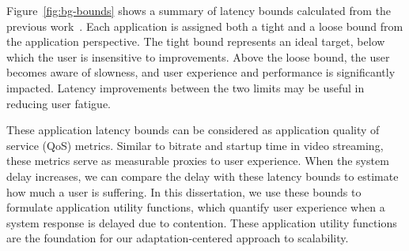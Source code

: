 Figure~\ref{fig:bg-bounds} shows a summary of latency bounds calculated from the
previous work~\cite{chen2017empirical}. Each application is assigned both a
tight and a loose bound from the application perspective. The tight bound
represents an ideal target, below which the user is insensitive to improvements.
Above the loose bound, the user becomes aware of slowness, and user experience
and performance is significantly impacted. Latency improvements between the two
limits may be useful in reducing user fatigue.

These application latency bounds can be considered as application quality of
service (QoS) metrics. Similar to bitrate and startup time in video streaming,
these metrics serve as measurable proxies to user experience. When the system
delay increases, we can compare the delay with these latency bounds to estimate
how much a user is suffering. In this dissertation, we use these bounds to
formulate application utility functions, which quantify user experience when a
system response is delayed due to contention. These application utility
functions are the foundation for our adaptation-centered approach to
scalability.
